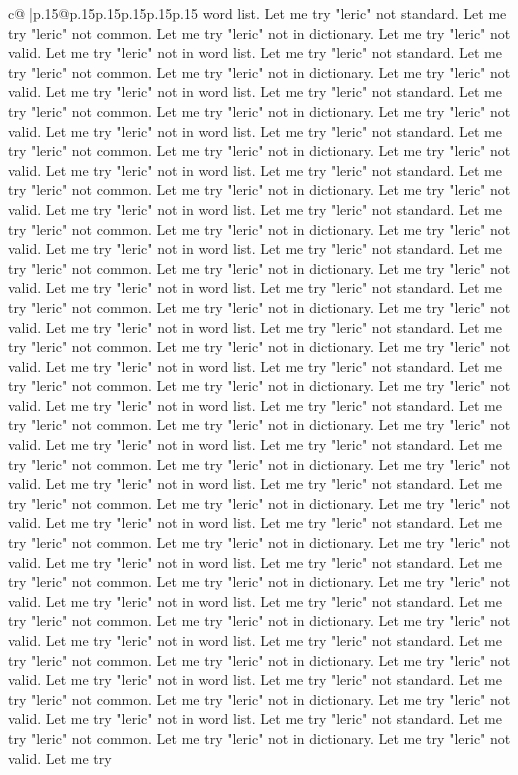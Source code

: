 \documentclass{article}
\begin{document}
{\begin{supertabular}{c@{$\;$}|p{.15\linewidth}@{}p{.15\linewidth}p{.15\linewidth}p{.15\linewidth}p{.15\linewidth}p{.15\linewidth}}
{{{word list. Let me try "leric" not standard. Let me try "leric" not common. Let me try "leric" not in dictionary. Let me try "leric" not valid. Let me try "leric" not in word list. Let me try "leric" not standard. Let me try "leric" not common. Let me try "leric" not in dictionary. Let me try "leric" not valid. Let me try "leric" not in word list. Let me try "leric" not standard. Let me try "leric" not common. Let me try "leric" not in dictionary. Let me try "leric" not valid. Let me try "leric" not in word list. Let me try "leric" not standard. Let me try "leric" not common. Let me try "leric" not in dictionary. Let me try "leric" not valid. Let me try "leric" not in word list. Let me try "leric" not standard. Let me try "leric" not common. Let me try "leric" not in dictionary. Let me try "leric" not valid. Let me try "leric" not in word list. Let me try "leric" not standard. Let me try "leric" not common. Let me try "leric" not in dictionary. Let me try "leric" not valid. Let me try "leric" not in word list. Let me try "leric" not standard. Let me try "leric" not common. Let me try "leric" not in dictionary. Let me try "leric" not valid. Let me try "leric" not in word list. Let me try "leric" not standard. Let me try "leric" not common. Let me try "leric" not in dictionary. Let me try "leric" not valid. Let me try "leric" not in word list. Let me try "leric" not standard. Let me try "leric" not common. Let me try "leric" not in dictionary. Let me try "leric" not valid. Let me try "leric" not in word list. Let me try "leric" not standard. Let me try "leric" not common. Let me try "leric" not in dictionary. Let me try "leric" not valid. Let me try "leric" not in word list. Let me try "leric" not standard. Let me try "leric" not common. Let me try "leric" not in dictionary. Let me try "leric" not valid. Let me try "leric" not in word list. Let me try "leric" not standard. Let me try "leric" not common. Let me try "leric" not in dictionary. Let me try "leric" not valid. Let me try "leric" not in word list. Let me try "leric" not standard. Let me try "leric" not common. Let me try "leric" not in dictionary. Let me try "leric" not valid. Let me try "leric" not in word list. Let me try "leric" not standard. Let me try "leric" not common. Let me try "leric" not in dictionary. Let me try "leric" not valid. Let me try "leric" not in word list. Let me try "leric" not standard. Let me try "leric" not common. Let me try "leric" not in dictionary. Let me try "leric" not valid. Let me try "leric" not in word list. Let me try "leric" not standard. Let me try "leric" not common. Let me try "leric" not in dictionary. Let me try "leric" not valid. Let me try "leric" not in word list. Let me try "leric" not standard. Let me try "leric" not common. Let me try "leric" not in dictionary. Let me try "leric" not valid. Let me try "leric" not in word list. Let me try "leric" not standard. Let me try "leric" not common. Let me try "leric" not in dictionary. Let me try "leric" not valid. Let me try "leric" not in word list. Let me try "leric" not standard. Let me try "leric" not common. Let me try "leric" not in dictionary. Let me try "leric" not valid. Let me try }}}
\end{supertabular}}
\end{document}
